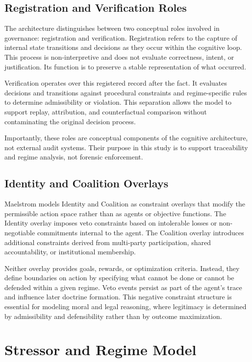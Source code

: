 \documentclass[11pt,a4paper]{article}
\begin{document}
\subsection{Registration and Verification Roles}

The architecture distinguishes between two conceptual roles involved in governance: registration and verification. Registration refers to the capture of internal state transitions and decisions as they occur within the cognitive loop. This process is non-interpretive and does not evaluate correctness, intent, or justification. Its function is to preserve a stable representation of what occurred.

Verification operates over this registered record after the fact. It evaluates decisions and transitions against procedural constraints and regime-specific rules to determine admissibility or violation. This separation allows the model to support replay, attribution, and counterfactual comparison without contaminating the original decision process.

Importantly, these roles are conceptual components of the cognitive architecture, not external audit systems. Their purpose in this study is to support traceability and regime analysis, not forensic enforcement.

\subsection{Identity and Coalition Overlays}

Maelstrom models Identity and Coalition as constraint overlays that modify the permissible action space rather than as agents or objective functions. The Identity overlay imposes veto constraints based on intolerable losses or non-negotiable commitments internal to the agent. The Coalition overlay introduces additional constraints derived from multi-party participation, shared accountability, or institutional membership.

Neither overlay provides goals, rewards, or optimization criteria. Instead, they define boundaries on action by specifying what cannot be done or cannot be defended within a given regime. Veto events persist as part of the agent's trace and influence later doctrine formation. This negative constraint structure is essential for modeling moral and legal reasoning, where legitimacy is determined by admissibility and defensibility rather than by outcome maximization.

\section{Stressor and Regime Model}
\end{document}
